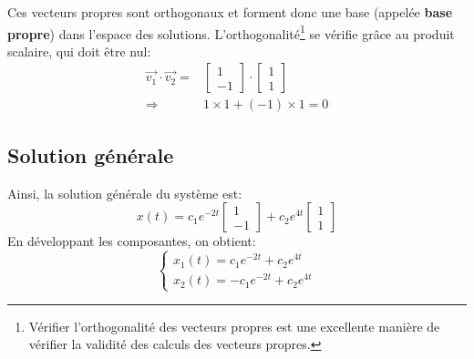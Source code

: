             Ces vecteurs propres sont orthogonaux et forment donc une base (appelée \textbf{base propre}) dans l'espace des solutions. L'orthogonalité\footnote{Vérifier l'orthogonalité des vecteurs propres est une excellente manière de vérifier la validité des calculs des vecteurs propres.} se vérifie grâce au produit scalaire, qui doit être nul:
            \begin{equation}
                \begin{split}
                    \overrightarrow{v_1}\cdot \overrightarrow{v_2} =&\begin{bmatrix} 1 \\ -1 \end{bmatrix} \cdot \begin{bmatrix} 1 \\ 1 \end{bmatrix} \\
                    \Rightarrow& 1 \times 1 + (-1) \times 1 = 0
                \end{split}
            \end{equation}
        
        \subsection{Solution générale}
            Ainsi, la solution générale du système est:
            \begin{equation}
                x(t)=c_1 e^{-2t} \begin{bmatrix} 1 \\ -1 \end{bmatrix} + c_2 e^{4t} \begin{bmatrix} 1 \\ 1 \end{bmatrix}
            \end{equation}
            En développant les composantes, on obtient:
            \begin{equation}
                \begin{cases}
                    x_1(t)=c_1 e^{-2t} + c_2 e^{4t} \\
                    x_2(t)=-c_1 e^{-2t} + c_2 e^{4t}
                \end{cases}
            \end{equation}
        
